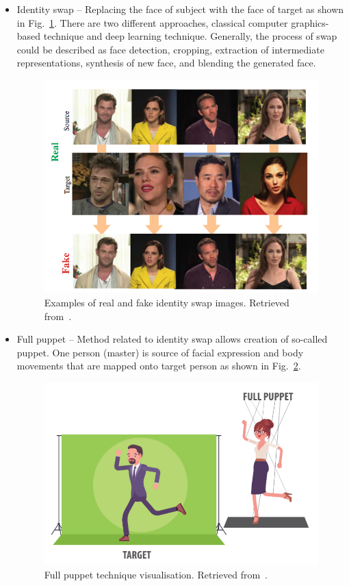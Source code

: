 \begin{itemize}
\item Identity swap – Replacing the face of subject with the face of target as shown in Fig.~\ref{fig:idenity_swap}. There are two different approaches, classical computer graphics-based technique and deep learning technique. Generally, the process of swap could be described as face detection, cropping, extraction of intermediate representations, synthesis of new face, and blending the generated face.
\begin{figure}[H]
    \centering
    \includegraphics[width=.53\linewidth]{other-fig/idenity_swap.png}
    \caption{Examples of real and fake identity swap images. Retrieved from~\cite{IntroductionToDigitalFaceManipulation}.}
\label{fig:idenity_swap}
\end{figure}

\item Full puppet – Method related to identity swap allows creation of so-called puppet. One person (master) is source of facial expression and body movements that are mapped onto target person as shown in Fig.~\ref{fig:full_puppet}.~\cite{IncreasingThreatofDeepfakeIdentites}
\begin{figure}[H]
    \centering
    \includegraphics[width=.41\linewidth]{other-fig/full_puppet.png}
    \caption{Full puppet technique visualisation. Retrieved from~\cite{TheThreatOfDeepfakes}.}
\label{fig:full_puppet}
\end{figure}


\end{itemize}
